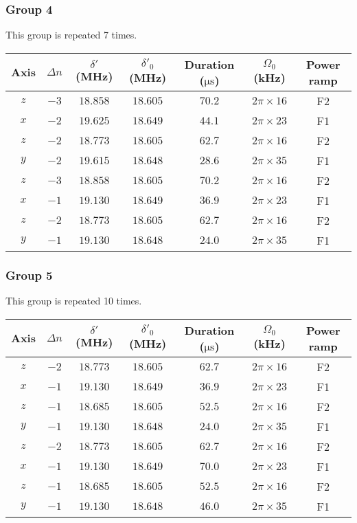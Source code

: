 \newpage
\subsubsection*{Group 4}
This group is repeated 7 times.
\begin{center}
  \begin{tabular}{|c|c|c|c|c|c|c|}
    \hline
    Axis&$\Delta n$&$\delta'$ (MHz)&$\delta'_0$ (MHz)&Duration ($\mathrm{\mu s}$)& $\Omega_0$ (kHz)&Power ramp\\\hline
    $z$&$-3$&$18.858$&$18.605$&$70.2$&$2\pi\times16$&F2\\\hline
    $x$&$-2$&$19.625$&$18.649$&$44.1$&$2\pi\times23$&F1\\\hline
    $z$&$-2$&$18.773$&$18.605$&$62.7$&$2\pi\times16$&F2\\\hline
    $y$&$-2$&$19.615$&$18.648$&$28.6$&$2\pi\times35$&F1\\\hline
    $z$&$-3$&$18.858$&$18.605$&$70.2$&$2\pi\times16$&F2\\\hline
    $x$&$-1$&$19.130$&$18.649$&$36.9$&$2\pi\times23$&F1\\\hline
    $z$&$-2$&$18.773$&$18.605$&$62.7$&$2\pi\times16$&F2\\\hline
    $y$&$-1$&$19.130$&$18.648$&$24.0$&$2\pi\times35$&F1\\\hline
  \end{tabular}
\end{center}

\newpage
\subsubsection*{Group 5}
This group is repeated 10 times.
\begin{center}
  \begin{tabular}{|c|c|c|c|c|c|c|}
    \hline
    Axis&$\Delta n$&$\delta'$ (MHz)&$\delta'_0$ (MHz)&Duration ($\mathrm{\mu s}$)& $\Omega_0$ (kHz)&Power ramp\\\hline
    $z$&$-2$&$18.773$&$18.605$&$62.7$&$2\pi\times16$&F2\\\hline
    $x$&$-1$&$19.130$&$18.649$&$36.9$&$2\pi\times23$&F1\\\hline
    $z$&$-1$&$18.685$&$18.605$&$52.5$&$2\pi\times16$&F2\\\hline
    $y$&$-1$&$19.130$&$18.648$&$24.0$&$2\pi\times35$&F1\\\hline
    $z$&$-2$&$18.773$&$18.605$&$62.7$&$2\pi\times16$&F2\\\hline
    $x$&$-1$&$19.130$&$18.649$&$70.0$&$2\pi\times23$&F1\\\hline
    $z$&$-1$&$18.685$&$18.605$&$52.5$&$2\pi\times16$&F2\\\hline
    $y$&$-1$&$19.130$&$18.648$&$46.0$&$2\pi\times35$&F1\\\hline
  \end{tabular}
\end{center}


